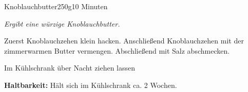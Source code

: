\begin{recipe}{Knoblauchbutter}{250g}{10 Minuten}

  \freeform
  \textit{Ergibt eine würzige Knoblauchbutter.}
  
  
  Zuerst Knoblauchzehen klein hacken.
  Anschließend Knoblauchzehen mit der zimmerwarmen Butter vermengen.
  Abschließend mit Salz abschmecken.
  
  \newstep
  Im Kühlschrank über Nacht ziehen lassen
  
  \freeform
  \hrulefill
  
  \freeform 
  \textbf{Haltbarkeit:}
  Hält sich im Kühlschrank ca. 2 Wochen.
  
  \end{recipe}
  